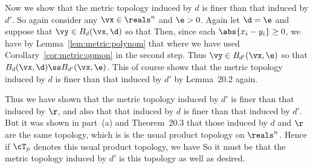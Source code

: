 {  Now we show that the metric topology induced by $d$ is finer than that induced by $d'$.
  So again consider any $\vx \in \reals^n$ and $\e > 0$.
  Again let $\d = \e$ and suppose that $\vy \in B_d(\vx, \d)$ so that
  Then, since each $\abs{x_i - y_i} \geq 0$, we have by Lemma~\ref{lem:metric:polynom} that
  where we have used Corollary~\ref{cor:metric:opmon} in the second step.
  Thus $\vy \in B_{d'}(\vx, \e)$ so that $B_d(\vx, \d) \ss B_{d'}(\vx, \e)$.
  This of course shows that the metric topology induced by $d$ is finer than that induced by $d'$ by Lemma~20.2 again.

  Thus we have shown that the metric topology induced by $d'$ is finer than that induced by $\r$, and also that that induced by $d$ is finer than that induced by $d'$.
  But it was shown in part~(a) and Theorem~20.3 that those induced by $d$ and $\r$ are the same topology, which is is the usual product topology on $\reals^n$.
  Hence if $\cT_p$ denotes this usual product topology, we have
  So it must be that the metric topology induced by $d'$ is this topology as well as desired.
}


